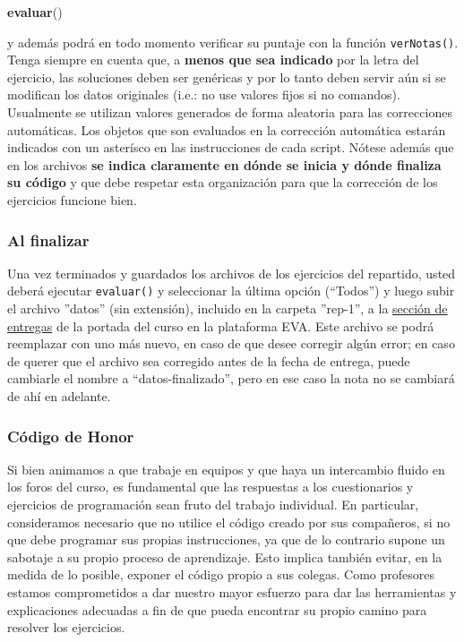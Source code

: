 \documentclass[]{article}
\newenvironment{Shaded}{}{}
\newcommand{\KeywordTok}[1]{\textcolor[rgb]{0.00,0.44,0.13}{\textbf{{#1}}}}
\newcommand{\NormalTok}[1]{{#1}}
\begin{document}
\begin{Shaded}
\begin{Highlighting}[]
\KeywordTok{evaluar}\NormalTok{()}
\end{Highlighting}
\end{Shaded}

y además podrá en todo momento verificar su puntaje con la función
\texttt{verNotas()}. Tenga siempre en cuenta que, a \textbf{menos que
sea indicado} por la letra del ejercicio, las soluciones deben ser
genéricas y por lo tanto deben servir aún si se modifican los datos
originales (i.e.: no use valores fijos si no comandos). Usualmente se
utilizan valores generados de forma aleatoria para las correcciones
automáticas. Los objetos que son evaluados en la corrección automática
estarán indicados con un asterísco en las instrucciones de cada script.
Nótese además que en los archivos \textbf{se indica claramente en dónde
se inicia y dónde finaliza su código} y que debe respetar esta
organización para que la corrección de los ejercicios funcione bien.

\subsubsection{Al finalizar}

Una vez terminados y guardados los archivos de los ejercicios del
repartido, usted deberá ejecutar \texttt{evaluar()} y seleccionar la
última opción (``Todos'') y luego subir el archivo ''datos'' (sin
extensión), incluido en la carpeta ''rep-1'', a la
\href{http://eva.universidad.edu.uy/mod/assign/view.php?id=103966}{sección
de entregas} de la portada del curso en la plataforma EVA. Este archivo
se podrá reemplazar con uno más nuevo, en caso de que desee corregir
algún error; en caso de querer que el archivo sea corregido antes de la
fecha de entrega, puede cambiarle el nombre a ``datos-finalizado'', pero
en ese caso la nota no se cambiará de ahí en adelante.

\subsubsection{Código de Honor}

Si bien animamos a que trabaje en equipos y que haya un intercambio
fluido en los foros del curso, es fundamental que las respuestas a los
cuestionarios y ejercicios de programación sean fruto del trabajo
individual. En particular, consideramos necesario que no utilice el
código creado por sus compañeros, si no que debe programar sus propias
instrucciones, ya que de lo contrario supone un sabotaje a su propio
proceso de aprendizaje. Esto implica también evitar, en la medida de lo
posible, exponer el código propio a sus colegas. Como profesores estamos
comprometidos a dar nuestro mayor esfuerzo para dar las herramientas y
explicaciones adecuadas a fin de que pueda encontrar su propio camino
para resolver los ejercicios.
\end{document}
